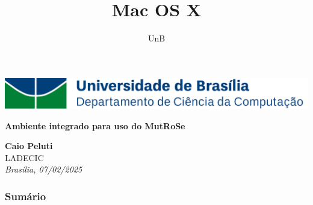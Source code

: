 \documentclass{beamer}
\title{Mac OS X} %
\author[Caio Peluti] %
{UnB\inst{1}}
\institute[CIC-UnB] %
\begin{document}



\begin{frame}[plain]{}
\begin{center}
\includegraphics[width=1.0\linewidth]{tipograma_CIC_4_alta.png} \hspace{0.2cm}\\
\vspace{0.75cm}
\begin{block}{ }
\begin{center}
\vspace{0.15cm}
\Large{ \textbf{Ambiente integrado para uso do MutRoSe}}
\vspace{0.15cm}
\end{center}
\end{block}
\vspace{0.4cm}
\textbf{Caio Peluti}\\
{\small  LADECIC}\\
\vspace{0.4cm}
\vspace{0.4cm}
{\it Brasília, 07/02/2025}\\
\vspace{0.25cm}
 \end{center}
\end{frame}

\begin{frame}
\frametitle{Sumário}
\tableofcontents
\end{frame}


\end{document}

